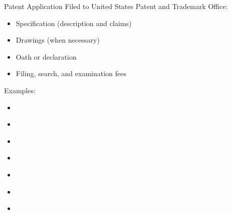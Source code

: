 \documentclass{beamer}
\begin{document}
\begin{frame}{Patent Application}
Filed to United States Patent and Trademark Office:
\begin{itemize}
\item Specification (description and claims)
\item Drawings (when necessary)
\item Oath or declaration
\item Filing, search, and examination fees
\end{itemize}
\bigskip
Examples:
\begin{itemize}
\item \href{http://www.google.com/patents/US5946647}{}
\item \href{http://www.google.com/patents/US7028023}{}
\item \href{http://www.google.com/patents/USD504889}{}
\item \href{https://www.google.com/patents/USD670713}{}
\item \href{https://www.google.com/patents/USD604305}{}
\item \href{https://www.google.com/patents/US7222078}{}
\item \href{http://www.google.com/patents/US5960411}{}
\end{itemize}
\end{frame}
\end{document}
